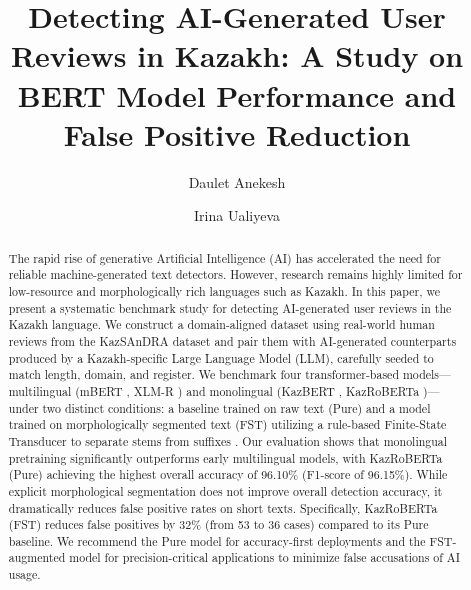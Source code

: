 \documentclass[runningheads]{llncs}
\begin{document}
\sloppy

\title{Detecting AI-Generated User Reviews in Kazakh: A Study on BERT Model Performance and False Positive Reduction}

\author{Daulet Anekesh \and Irina Ualiyeva}


\maketitle

\begin{abstract}
The rapid rise of generative Artificial Intelligence (AI) has accelerated the need for reliable machine-generated text detectors. However, research remains highly limited for low-resource and morphologically rich languages such as Kazakh. In this paper, we present a systematic benchmark study for detecting AI-generated user reviews in the Kazakh language. We construct a domain-aligned dataset using real-world human reviews from the KazSAnDRA dataset \cite{1} and pair them with AI-generated counterparts produced by a Kazakh-specific Large Language Model (LLM), carefully seeded to match length, domain, and register.
We benchmark four transformer-based models---multilingual (mBERT \cite{2}, XLM-R \cite{3}) and monolingual (KazBERT \cite{4}, KazRoBERTa \cite{5})---under two distinct conditions: a baseline trained on raw text (Pure) and a model trained on morphologically segmented text (FST) utilizing a rule-based Finite-State Transducer to separate stems from suffixes \cite{6}. Our evaluation shows that monolingual pretraining significantly outperforms early multilingual models, with KazRoBERTa (Pure) achieving the highest overall accuracy of 96.10\% (F1-score of 96.15\%). While explicit morphological segmentation does not improve overall detection accuracy, it dramatically reduces false positive rates on short texts. Specifically, KazRoBERTa (FST) reduces false positives by 32\% (from 53 to 36 cases) compared to its Pure baseline. We recommend the Pure model for accuracy-first deployments and the FST-augmented model for precision-critical applications to minimize false accusations of AI usage.
\end{abstract}
\end{document}
